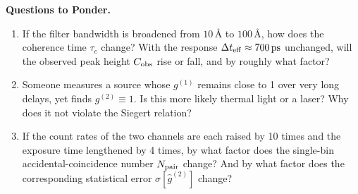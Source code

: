 \medskip
\noindent\textbf{Questions to Ponder.}
\begin{enumerate}
  \item If the filter bandwidth is broadened from \(10\,\text{\AA}\) to \(100\,\text{\AA}\), how does the coherence time \(\tau_c\) change? With the response \(\Delta t_{\rm eff}\approx700\,{\rm ps}\) unchanged, will the observed peak height \(C_{\rm obs}\) rise or fall, and by roughly what factor?
  \item Someone measures a source whose \(g^{(1)}\) remains close to 1 over very long delays, yet finds \(g^{(2)}\equiv1\). Is this more likely thermal light or a laser? Why does it not violate the Siegert relation?
  \item If the count rates of the two channels are each raised by 10 times and the exposure time lengthened by 4 times, by what factor does the single-bin accidental-coincidence number \(N_{\rm pair}\) change? And by what factor does the corresponding statistical error \(\sigma[\widehat g^{(2)}]\) change?
\end{enumerate}
